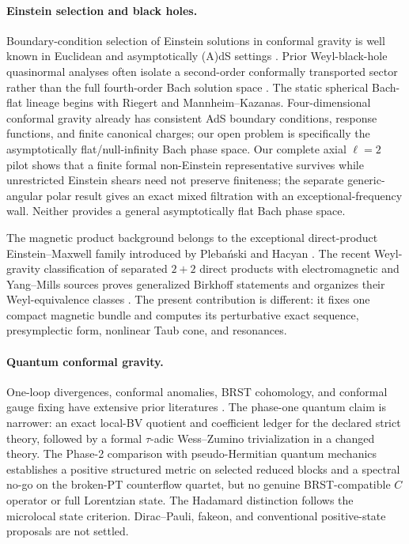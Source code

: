 \documentclass[11pt]{article}
\begin{document}
\paragraph{Einstein selection and black holes.}
Boundary-condition selection of Einstein solutions in conformal gravity is
well known in Euclidean and asymptotically (A)dS settings
\cite{Maldacena,LuPangPope,DeserJoungWaldron}.  Prior Weyl-black-hole
quasinormal analyses often isolate a second-order conformally transported
sector rather than the full fourth-order Bach solution space
\cite{MomenniaHendi}.  The static spherical Bach-flat lineage begins with
Riegert and Mannheim--Kazanas\cite{Riegert,MannheimKazanas}.  Four-dimensional
conformal gravity already has consistent AdS boundary conditions, response
functions, and finite canonical charges\cite{GrumillerEtAl,Lovrekovic}; our
open problem is specifically the asymptotically flat/null-infinity Bach phase
space.  Our complete axial $\ell=2$ pilot shows that a finite formal
non-Einstein representative survives while unrestricted Einstein shears need
not preserve finiteness; the separate generic-angular polar result gives an
exact mixed filtration with an exceptional-frequency wall.  Neither provides a general
asymptotically flat Bach phase space.

The magnetic product background belongs to the exceptional direct-product
Einstein--Maxwell family introduced by Pleba\'nski and Hacyan
\cite{PlebanskiHacyan}.  The recent Weyl-gravity classification of separated
$2+2$ direct products with electromagnetic and Yang--Mills sources proves
generalized Birkhoff statements and organizes their Weyl-equivalence classes
\cite{JizbaLeheckova}.  The present contribution is different: it fixes one
compact magnetic bundle and computes its perturbative exact sequence,
presymplectic form, nonlinear Taub cone, and resonances.

\paragraph{Quantum conformal gravity.}
One-loop divergences, conformal anomalies, BRST cohomology, and conformal
gauge fixing have extensive prior literatures
\cite{FradkinTseytlin1982,FradkinTseytlin1984,
BarnichBrandtHenneaux,Rachwal,OdaOhta}.  The phase-one quantum
claim is narrower: an exact local-BV quotient and coefficient ledger for the
declared strict theory, followed by a formal $\tau$-adic Wess--Zumino
trivialization in a changed theory.  The Phase-2 comparison with
pseudo-Hermitian quantum mechanics\cite{Mostafazadeh,Kuntz} establishes a
positive structured metric on selected reduced blocks and a spectral no-go
on the broken-PT counterflow quartet, but no genuine BRST-compatible $C$
operator or full Lorentzian state.  The Hadamard distinction follows the
microlocal state criterion\cite{Radzikowski}.  Dirac--Pauli, fakeon, and
conventional positive-state proposals are not settled.
\end{document}
